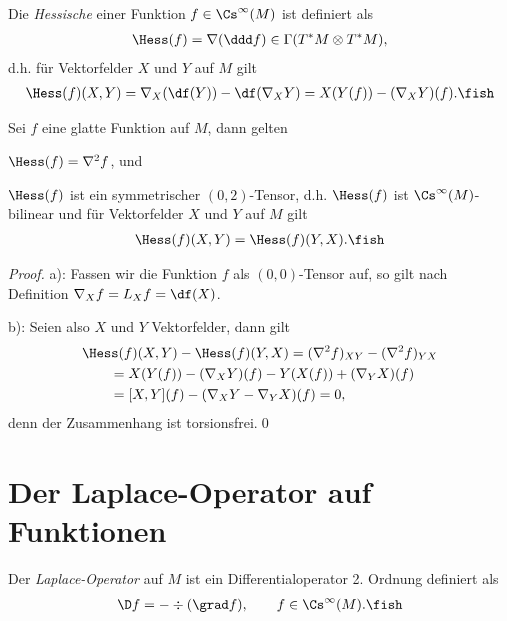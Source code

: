 \documentclass[%
	paper=a5,%
	fleqn,%
	DIV=18,%
	BCOR=0mm,
	fontsize=11pt,
	titlepage=false,%
	bibliography=totoc,
	DIV=18,%
	twoside=true,
	pdftitle=Riemannsche Geometrie,
	pdfauthor=Uwe Semmelmann,
	numbers=noendperiod]%
	{scrbook}
\begin{document}
\begin{defn}
Die \emph{Hessische} einer Funktion $f\in\Cs^\infty(M)$ ist definiert als
\begin{align*}
\Hess(f) = \nabla(\ddd f) \in\Gamma(T^*M\otimes T^*M),
\end{align*}
d.h. für Vektorfelder $X$ und $Y$ auf $M$ gilt
\begin{align*}
\Hess(f)(X,Y) = \nabla_{X}(\df(Y)) - \df(\nabla_{X}Y) = X(Y(f)) - (\nabla_{X}Y)(f).\fish
\end{align*}
\end{defn}

\begin{lem}
Sei $f$ eine glatte Funktion auf $M$, dann gelten
\begin{propenum}
\item $\Hess(f) = \nabla^2 f$, und
\item $\Hess(f)$ ist ein symmetrischer $(0,2)$-Tensor, d.h. $\Hess(f)$ ist $\Cs^\infty(M)$-bilinear und für Vektorfelder $X$ und $Y$ auf $M$ gilt
\begin{align*}
\Hess(f)(X,Y) = \Hess(f)(Y,X).\fish
\end{align*}
\end{propenum}
\end{lem}

\begin{proof}
a): Fassen wir die Funktion $f$ als $(0,0)$-Tensor auf, so gilt nach Definition $\nabla_{X} f = L_{X}f = \df(X)$.

b): Seien also $X$ und $Y$ Vektorfelder, dann gilt
\begin{align*}
&\Hess(f)(X,Y) - \Hess(f)(Y,X) = (\nabla^2 f)_{XY}-(\nabla^2 f)_{YX} \\
&\qquad= 
X(Y(f)) - (\nabla_{X}Y)(f) - Y(X(f)) + (\nabla_{Y}X)(f)\\
&\qquad= [X,Y](f) - (\nabla_{X}Y-\nabla_{Y}X)(f) = 0,
\end{align*}
denn der Zusammenhang ist torsionsfrei.\qed
\end{proof}

\section{Der Laplace-Operator auf Funktionen}

\begin{defn}
Der \emph{Laplace-Operator} auf $M$ ist ein Differentialoperator 2. Ordnung definiert als
\begin{align*}
\D f = - \div(\grad f),\qquad f\in\Cs^\infty(M).\fish
\end{align*}
\end{defn}
\end{document}
